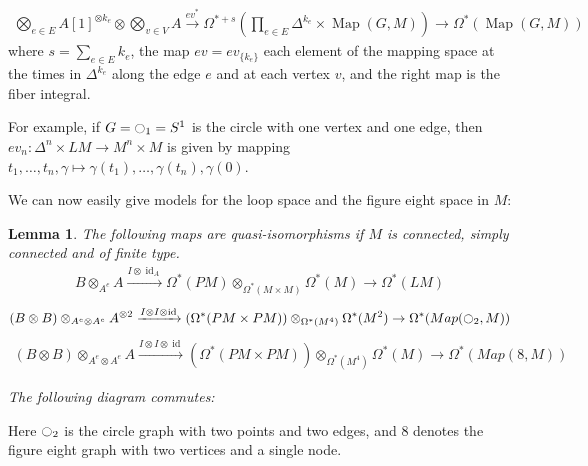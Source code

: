\documentclass{scrartcl}
\theoremstyle{plain}
\newtheorem{lemma}[theorem]{Lemma}
\theoremstyle{definition}
\let\xto\xrightarrow
\DeclareMathOperator{\id}{id}
\DeclareMathOperator{\Map}{Map}
\newcommand{\Prod}{\prod}
\begin{document}
\begin{align*}
    \bigotimes_{e\in E} A[1]^{\otimes k_e} \otimes \bigotimes_{v\in V} A \xto{ev^*} \Omega^{*+s}\left(\Prod_{e\in E} \Delta^{k_e} \times \Map(G, M)\right) \to \Omega^*(\Map(G, M))
\end{align*}
where $s=\sum_{e\in E} k_e$, the map $ev=ev_{\{k_e\}}$ each element of the mapping space at the times in $\Delta^{k_e}$ along the edge $e$ and at each vertex $v$, and the right map is the fiber integral. 

For example, if $G=\ocircle_1=S^1$ is the circle with one vertex and one edge, then $ev_n\colon \Delta^n\times LM\to M^n\times M$ is given by mapping $t_1,\dots, t_n, \gamma\mapsto \gamma(t_1),\dots,\gamma(t_n), \gamma(0)$.


We can now easily give models for the loop space and the figure eight space in $M$: 
\begin{lemma}\label{lem:model-quasi-iso-examples}
    The following maps are quasi-isomorphisms if $M$ is connected, simply connected and of finite type.
    \begin{align*}
        B\otimes_{A^e} A\xto{I\otimes\id_A}\Omega^*(PM)\otimes_{\Omega^*(M\times M)}\Omega^*(M)\to \Omega^*(LM)
    \end{align*}
    \begin{align*}
        (B\otimes B)\otimes_{A^e\otimes A^e} A^{\otimes 2} \xto{I\otimes I\otimes \id} (\Omega^*(PM\times PM))\otimes_{\Omega^*(M^4)} \Omega^*(M^2) \to \Omega^*(Map(\ocircle_2, M))
    \end{align*}
    \begin{align*}
        (B\otimes B)\otimes_{A^e\otimes A^e} A \xto{I\otimes I\otimes \id} (\Omega^*(PM\times PM))\otimes_{\Omega^*(M^4)} \Omega^*(M) \to \Omega^*(Map(8, M))
    \end{align*}

    The following diagram commutes:
    \begin{center}
    \end{center}
\end{lemma}
Here $\ocircle_2$ is the circle graph with two points and two edges, and $8$ denotes the figure eight graph with two vertices and a single node.
\end{document}

